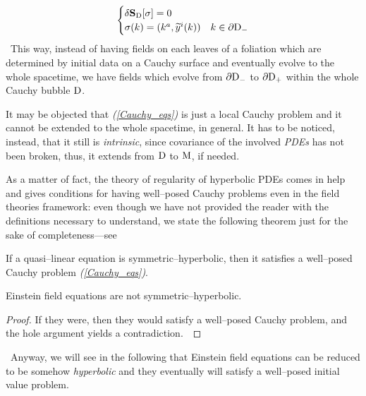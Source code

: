 \begin{equation}\label{Cauchy_eqs}
    \begin{cases}
    \delta\mathbf{S}_{\text{\normalfont D}}[\sigma]=0\\
    \sigma(k)=(k^a,\widetilde{y}^i(k))& k\in\partial\text{\normalfont D}_-
\end{cases}
\end{equation}
\,\newline
This way, instead of having fields on each leaves of a foliation which are determined by initial data on a Cauchy surface and eventually evolve to the whole spacetime, we have fields which evolve from $\partial \text{\normalfont D}_-$ to $\partial\text{\normalfont D}_+$ within the whole Cauchy bubble $\text{\normalfont D}$.


\begin{remark}
    It may be objected that \emph{(\ref{Cauchy_eqs})} is just a local Cauchy problem and it cannot be extended to the whole spacetime, in general. It has to be noticed, instead, that it still is \emph{intrinsic}, since covariance of the involved \emph{PDEs} has not been broken, thus, it extends from $\text{\normalfont D}$ to $\text{\normalfont M}$, if needed.
\end{remark}

As a matter of fact, the theory of regularity of hyperbolic PDEs comes in help and gives conditions for having well--posed Cauchy problems even in the field theories framework: even though we have not provided the reader with the definitions necessary to understand, we state the following theorem just for the sake of completeness---see \cite{LN2}

\begin{teo}
    If a quasi--linear equation is symmetric--hyperbolic, then it satisfies a well--posed Cauchy problem \emph{(\ref{Cauchy_eqs})}. 
\end{teo}

\begin{cor}
    Einstein field equations are not symmetric--hyperbolic.  
\end{cor}
\begin{proof}
    If they were, then they would satisfy a well--posed Cauchy problem, and the hole argument yields a contradiction.
    \,\newline
\end{proof}
\,\newline
Anyway, we will see in the following that Einstein field equations can be reduced to be somehow \emph{hyperbolic} and they eventually will satisfy a well--posed initial value problem.

